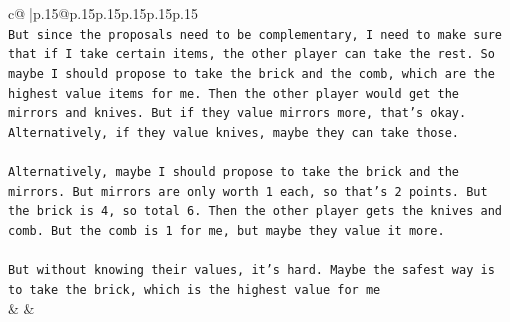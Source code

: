 \documentclass{article}
\begin{document}
{\begin{supertabular}{c@{$\;$}|p{.15\linewidth}@{}p{.15\linewidth}p{.15\linewidth}p{.15\linewidth}p{.15\linewidth}p{.15\linewidth}}
{{{\\ 
\texttt{But since the proposals need to be complementary, I need to make sure that if I take certain items, the other player can take the rest. So maybe I should propose to take the brick and the comb, which are the highest value items for me. Then the other player would get the mirrors and knives. But if they value mirrors more, that's okay. Alternatively, if they value knives, maybe they can take those.} \\
\\ 
\texttt{Alternatively, maybe I should propose to take the brick and the mirrors. But mirrors are only worth 1 each, so that's 2 points. But the brick is 4, so total 6. Then the other player gets the knives and comb. But the comb is 1 for me, but maybe they value it more.} \\
\\ 
\texttt{But without knowing their values, it's hard. Maybe the safest way is to take the brick, which is the highest value for me} \\
            }
        }
    }
    & & \\ \\


\end{supertabular}}
\end{document}
